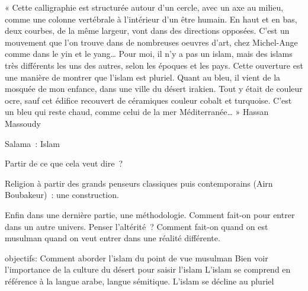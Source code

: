 « Cette calligraphie est structurée autour d'un cercle, avec un axe au
milieu, comme une colonne vertébrale à l'intérieur d'un être humain. En
haut et en bas, deux courbes, de la même largeur, vont dans des
directions opposées. C'est un mouvement que l'on trouve dans de
nombreuses  oeuvres d'art, chez Michel-Ange comme dans le yin et le
yang\ldots{} Pour moi, il n'y a pas un islam, mais des islams très
différents les uns des autres, selon les époques et les pays. Cette
ouverture est une manière de montrer que l'islam est pluriel. Quant au
bleu, il vient de la mosquée de mon enfance, dans une ville du désert
irakien. Tout y était de couleur ocre, sauf cet édifice recouvert de
céramiques couleur cobalt et turquoise. C'est un bleu qui reste chaud,
comme celui de la mer Méditerranée\ldots{} » Hassan Massoudy



Salama~: Islam

Partir de ce que cela veut dire~?

Religion à partir des grands penseurs classiques puis contemporains
(Airn Boubakeur)~: une construction.

Enfin dans une dernière partie, une méthodologie. Comment fait-on pour
entrer dans un autre univers. Penser l'altérité~? Comment fait-on quand
on est musulman quand on veut entrer dans une réalité différente.


objectifs:
Comment aborder l'islam du point de vue
musulman
Bien voir l'importance de la culture du
désert pour saisir l'islam
L'islam se comprend en référence à la
langue arabe, langue sémitique.
L'islam se décline au
pluriel


